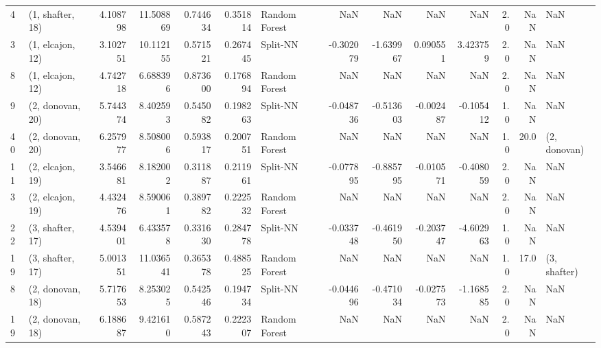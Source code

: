 \begin{tabular}{llrrrrlrrrrrrl}
4  &  (1, shafter, 18) &   4.108798 &  11.508869 &   0.744634 &  0.351814 &  Random Forest &             NaN &           NaN &            NaN &          NaN &            2.0 &    NaN &              NaN \\
3  &  (1, elcajon, 12) &   3.102751 &  10.112155 &   0.571521 &  0.267445 &       Split-NN &       -0.302079 &     -1.639967 &       0.090551 &     3.423759 &            2.0 &    NaN &              NaN \\
8  &  (1, elcajon, 12) &   4.742718 &   6.688396 &   0.873600 &  0.176894 &  Random Forest &             NaN &           NaN &            NaN &          NaN &            2.0 &    NaN &              NaN \\
9  &  (2, donovan, 20) &   5.744374 &   8.402593 &   0.545082 &  0.198263 &       Split-NN &       -0.048736 &     -0.513603 &      -0.002487 &    -0.105412 &            1.0 &    NaN &              NaN \\
40 &  (2, donovan, 20) &   6.257977 &   8.508006 &   0.593817 &  0.200751 &  Random Forest &             NaN &           NaN &            NaN &          NaN &            1.0 &   20.0 &     (2, donovan) \\
11 &  (2, elcajon, 19) &   3.546681 &   8.182002 &   0.311887 &  0.211961 &       Split-NN &       -0.077895 &     -0.885795 &      -0.010571 &    -0.408059 &            2.0 &    NaN &              NaN \\
3  &  (2, elcajon, 19) &   4.432476 &   8.590061 &   0.389782 &  0.222532 &  Random Forest &             NaN &           NaN &            NaN &          NaN &            2.0 &    NaN &              NaN \\
22 &  (3, shafter, 17) &   4.539401 &   6.433578 &   0.331630 &  0.284778 &       Split-NN &       -0.033748 &     -0.461950 &      -0.203747 &    -4.602963 &            1.0 &    NaN &              NaN \\
19 &  (3, shafter, 17) &   5.001351 &  11.036541 &   0.365378 &  0.488525 &  Random Forest &             NaN &           NaN &            NaN &          NaN &            1.0 &   17.0 &     (3, shafter) \\
8  &  (2, donovan, 18) &   5.717653 &   8.253025 &   0.542546 &  0.194734 &       Split-NN &       -0.044696 &     -0.471034 &      -0.027573 &    -1.168585 &            2.0 &    NaN &              NaN \\
19 &  (2, donovan, 18) &   6.188687 &   9.421610 &   0.587243 &  0.222307 &  Random Forest &             NaN &           NaN &            NaN &          NaN &            2.0 &    NaN &              NaN \\

\end{tabular}
